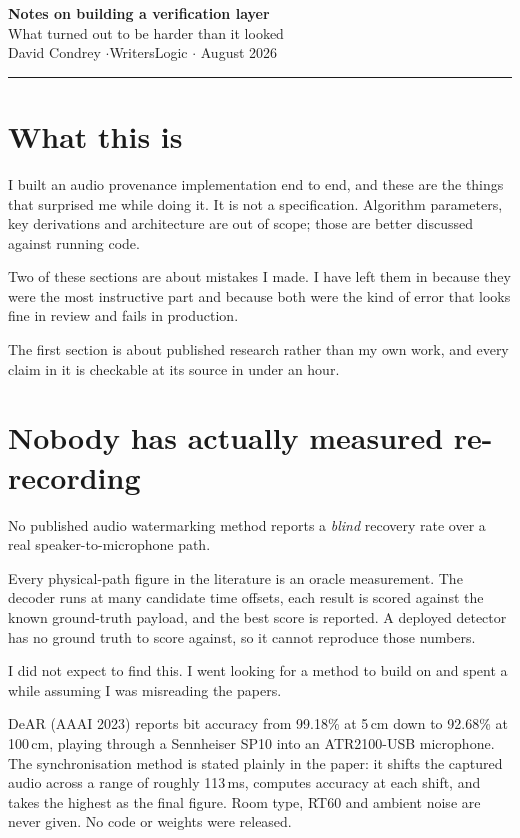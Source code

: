 \documentclass[11pt]{article}
\begin{document}
\begin{center}
{\sansfont\LARGE\bfseries Notes on building a verification layer}\\[6pt]
{\sansfont\large\textcolor{quiet}{What turned out to be harder than it looked}}\\[14pt]
{\sansfont\small David Condrey \quad\textcolor{quiet}{$\cdot$}\quad WritersLogic \quad\textcolor{quiet}{$\cdot$} August 2026}
\end{center}

\vspace{4pt}
\textcolor{rule}{\hrule}
\vspace{10pt}

\section*{What this is}

I built an audio provenance implementation end to end, and these are the things
that surprised me while doing it. It is not a specification. Algorithm
parameters, key derivations and architecture are out of scope; those are better
discussed against running code.

Two of these sections are about mistakes I made. I have left them in because
they were the most instructive part and because both were the kind of error that
looks fine in review and fails in production.

The first section is about published research rather than my own work, and
every claim in it is checkable at its source in under an hour.

\section{Nobody has actually measured re-recording}

No published audio watermarking method reports a \emph{blind} recovery rate over
a real speaker-to-microphone path.

Every physical-path figure in the literature is an oracle measurement. The
decoder runs at many candidate time offsets, each result is scored against the
known ground-truth payload, and the best score is reported. A deployed detector
has no ground truth to score against, so it cannot reproduce those numbers.

I did not expect to find this. I went looking for a method to build on and spent
a while assuming I was misreading the papers.

DeAR (AAAI 2023) reports bit accuracy from 99.18\% at 5\,cm down to 92.68\% at
100\,cm, playing through a Sennheiser SP10 into an ATR2100-USB microphone. The
synchronisation method is stated plainly in the paper: it shifts the captured
audio across a range of roughly 113\,ms, computes accuracy at each shift, and
takes the highest as the final figure. Room type, RT60 and ambient noise are
never given. No code or weights were released.
\end{document}
